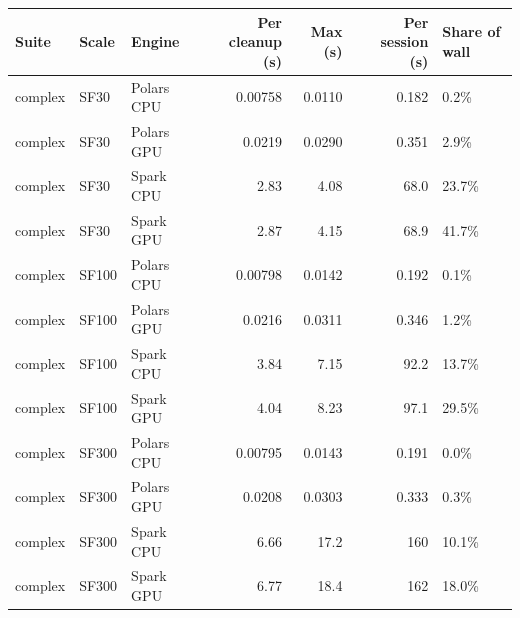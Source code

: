 \begin{tabular}{lllrrrl}
\toprule
Suite & Scale & Engine & Per cleanup (s) & Max (s) & Per session (s) & Share of wall \\
\midrule
complex & SF30 & Polars CPU & 0.00758 & 0.0110 & 0.182 & 0.2\% \\
complex & SF30 & Polars GPU & 0.0219 & 0.0290 & 0.351 & 2.9\% \\
complex & SF30 & Spark CPU & 2.83 & 4.08 & 68.0 & 23.7\% \\
complex & SF30 & Spark GPU & 2.87 & 4.15 & 68.9 & 41.7\% \\
complex & SF100 & Polars CPU & 0.00798 & 0.0142 & 0.192 & 0.1\% \\
complex & SF100 & Polars GPU & 0.0216 & 0.0311 & 0.346 & 1.2\% \\
complex & SF100 & Spark CPU & 3.84 & 7.15 & 92.2 & 13.7\% \\
complex & SF100 & Spark GPU & 4.04 & 8.23 & 97.1 & 29.5\% \\
complex & SF300 & Polars CPU & 0.00795 & 0.0143 & 0.191 & 0.0\% \\
complex & SF300 & Polars GPU & 0.0208 & 0.0303 & 0.333 & 0.3\% \\
complex & SF300 & Spark CPU & 6.66 & 17.2 & 160 & 10.1\% \\
complex & SF300 & Spark GPU & 6.77 & 18.4 & 162 & 18.0\% \\
\bottomrule
\end{tabular}
